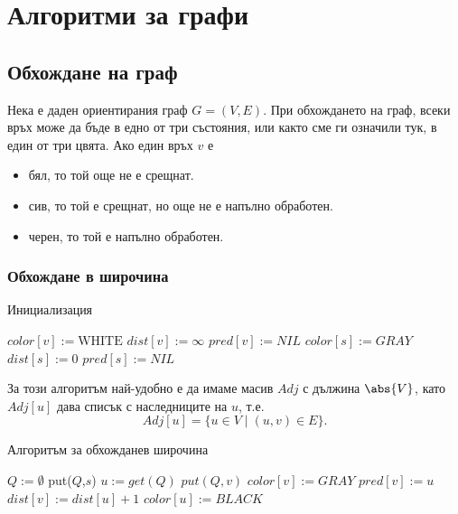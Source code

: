 \chapter {Алгоритми за графи}

\section{Обхождане на граф}

Нека е даден ориентирания граф $G = (V,E)$.
При обхождането на граф, всеки връх може да бъде в едно от три състояния, или както сме ги означили тук, в един от три цвята.
Ако един връх $v$ е
\begin{itemize}
\item 
  бял, то той още не е срещнат.
\item
  сив, то той е срещнат, но още не е напълно обработен.
\item
  черен, то той е напълно обработен.
\end{itemize}


\subsection{Обхождане в широчина}


\begin{algorithm}
  \caption{Инициализация}
  \label{alg:bfs-init}
  \begin{algorithmic}[1]
    \State $color[v] := \mbox{WHITE}$
    \State $dist[v] := \infty$
    \State $pred[v] := NIL$
    \EndFor
    \State $color[s]:=GRAY$
    \State $dist[s]:=0$
    \State $pred[s]:=NIL$
    \EndProcedure
  \end{algorithmic}
\end{algorithm}

За този алгоритъм най-удобно е да имаме масив $Adj$ с дължина $\abs{V}$,
като $Adj[u]$ дава списък с наследниците на $u$, т.е.
\[Adj[u] = \{u \in V \mid (u,v) \in E\}.\]

\begin{algorithm}
  \caption{Алгоритъм за обхожданев широчина}
  \label{alg:bfs}
  \begin{algorithmic}[1]
    \State {}
    \State $Q := \emptyset$
    \State put($Q$,$s$)
    \State $u := get(Q)$
    \State $put(Q,v)$
    \State $color[v] := GRAY$
    \State $pred[v] := u$
    \State $dist[v] := dist[u] + 1$
    \EndIf
    \EndFor
    \State $color[u] := BLACK$
    \EndWhile
    \EndProcedure
  \end{algorithmic}
\end{algorithm}

